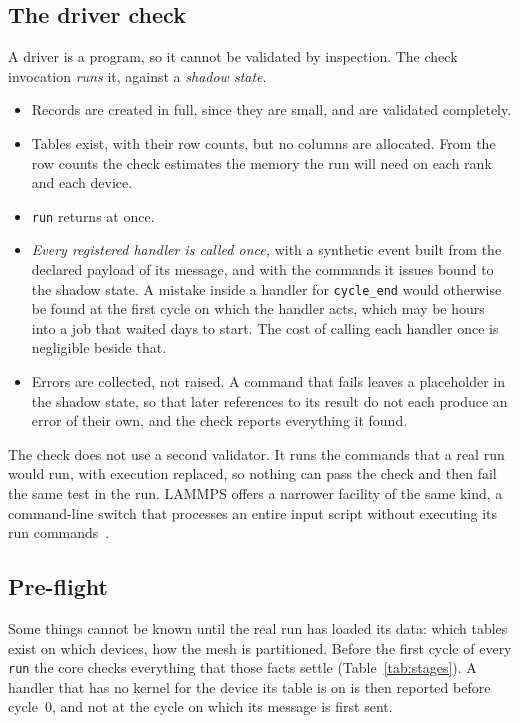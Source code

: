 \documentclass[11pt,a4paper]{article}
\newcommand{\code}[1]{\texttt{#1}}
\begin{document}
\subsection{The driver check}

A driver is a program, so it cannot be validated by inspection.  The check
invocation \emph{runs} it, against a \emph{shadow state}.

\begin{itemize}
  \item Records are created in full, since they are small, and are
        validated completely.
  \item Tables exist, with their row counts, but no columns are allocated.
        From the row counts the check estimates the memory the run will need
        on each rank and each device.
  \item \code{run} returns at once.
  \item \emph{Every registered handler is called once,} with a synthetic
        event built from the declared payload of its message, and with the
        commands it issues bound to the shadow state.  A mistake inside a
        handler for \code{cycle\_end} would otherwise be found at the first
        cycle on which the handler acts, which may be hours into a job that
        waited days to start.  The cost of calling each handler once is
        negligible beside that.
  \item Errors are collected, not raised.  A command that fails leaves a
        placeholder in the shadow state, so that later references to its
        result do not each produce an error of their own, and the check
        reports everything it found.
\end{itemize}

The check does not use a second validator.  It runs the commands that a
real run would run, with execution replaced, so nothing can pass the check
and then fail the same test in the run.  LAMMPS offers a narrower facility
of the same kind, a command-line switch that processes an entire input
script without executing its run commands~\cite{lammpsskiprun}.

\subsection{Pre-flight}
\label{sec:preflight}

Some things cannot be known until the real run has loaded its data: which
tables exist on which devices, how the mesh is partitioned.  Before the
first cycle of every \code{run} the core checks everything that those
facts settle (Table~\ref{tab:stages}).  A handler that has no kernel for
the device its table is on is then reported before cycle~0, and not at the
cycle on which its message is first sent.
\end{document}
